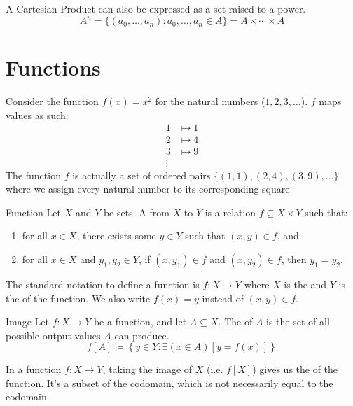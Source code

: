 \documentclass[letterpaper,12pt]{report}
\begin{document}
A Cartesian Product can also be expressed as a set raised to a power.
\[A^n = \{(a_0, \ldots, a_n) : a_0, \ldots, a_n \in A\} = A \times \cdots \times A\]

\iffalse
\begin{dfnbox}{Partition}{}
    A \dfntxt{partition} of a set is a grouping of its elements into non-empty subsets where every element is included in exactly one subset.
\end{dfnbox}
\fi
\section{Functions}
Consider the function $f(x) = x^2$ for the natural numbers ($1, 2, 3, \ldots$). $f$ maps values as such:
\begin{align*}
	1 &\mapsto 1 \\
	2 &\mapsto 4 \\
	3 &\mapsto 9 \\
	\vdots
\end{align*}
The function $f$ is actually a set of ordered pairs $\{ (1,1), (2,4), (3,9), \ldots \}$ where we assign every natural number to its corresponding square.
\begin{dfnbox}{Function}{}
	Let $X$ and $Y$ be sets. A  from $X$ to $Y$ is a relation $f \subseteq X \times Y$ such that:
	\begin{enumerate}
		\item for all $x \in X$, there exists some $y \in Y$ such that $(x,y) \in f$, and
		\item for all $x \in X$ and $y_1, y_2 \in Y$, if $(x,y_1) \in f$ and $(x, y_2) \in f$, then $y_1 = y_2$.
	\end{enumerate}
\end{dfnbox}

The standard notation to define a function is $f : X \to Y$ where $X$ is the  and $Y$ is the  of the function. We also write $f(x) = y$ instead of $(x,y) \in f$.

\begin{dfnbox}{Image}{}
	Let $f : X \to Y$ be a function, and let $A \subseteq X$. The  of $A$ is the set of all possible output values $A$ can produce.
	\tcblower
	\[ f[A] \coloneq \left\{ y \in Y : \exists(x \in A)\left[y = f(x)\right] \right\} \]
\end{dfnbox}

In a function $f : X \to Y$, taking the image of $X$ (i.e. $f[X]$) gives us the  of the function. It's a subset of the codomain, which is not necessarily equal to the codomain.
\end{document}

